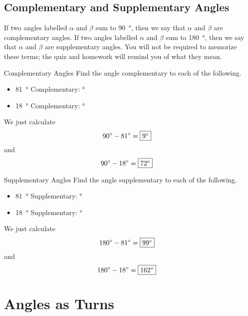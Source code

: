 \documentclass[a4paper,10pt]{report}
\begin{document}
\subsection{Complementary and Supplementary Angles}

If two angles labelled $\alpha$ and $\beta$ sum to \SI{90}{\degree}, then we say
that $\alpha$ and $\beta$ are complementary angles. If two angles labelled
$\alpha$ and $\beta$ sum to \SI{180}{\degree}, then we say that $\alpha$ and
$\beta$ are supplementary angles. You will not be required to memorize these
terms; the quiz and homework will remind you of what they mean.

\begin{problem}{Complementary Angles}
 Find the angle complementary to each of the following.

 \begin{itemize}
  \item \SI{81}{\degree} \hfill Complementary: \blankC \si{\degree}
  \item \SI{18}{\degree} \hfill Complementary: \blankC \si{\degree}
 \end{itemize}

 \begin{solution}
   We just calculate \[
    \SI{90}{\degree}-\SI{81}{\degree}=\Ans{\SI{9}{\degree}}
   \]
   and \[
    \SI{90}{\degree}-\SI{18}{\degree}=\Ans{\SI{72}{\degree}}
   \]
 \end{solution}
\end{problem}

\begin{problem}{Supplementary Angles}
 Find the angle supplementary to each of the following.

 \begin{itemize}
  \item \SI{81}{\degree} \hfill Supplementary: \blankC \si{\degree}
  \item \SI{18}{\degree} \hfill Supplementary: \blankC \si{\degree}
 \end{itemize}

 \begin{solution}
   We just calculate \[
    \SI{180}{\degree}-\SI{81}{\degree}=\Ans{\SI{99}{\degree}}
   \]
   and \[
    \SI{180}{\degree}-\SI{18}{\degree}=\Ans{\SI{162}{\degree}}
   \]
 \end{solution}
\end{problem}

\section{Angles as Turns}
\end{document}
